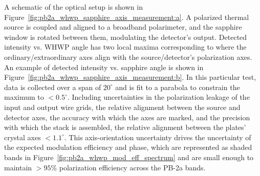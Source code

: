 A schematic of the optical setup is shown in Figure~\ref{fig:pb2a_whwp_sapphire_axis_measurement:a}. A polarized thermal source is coupled and aligned to a broadband polarimeter, and the sapphire window is rotated between them, modulating the detector's output. Detected intensity vs. WHWP angle has two local maxima corresponding to where the ordinary/extraordinary axes align with the source/detector's polarization axes. An example of detected intensity vs. sapphire angle is shown in Figure~\ref{fig:pb2a_whwp_sapphire_axis_measurement:b}. In this particular test, data is collected over a span of $20^{\circ}$ and is fit to a parabola to constrain the maximum to $< 0.5^{\circ}$. Including uncertainties in the polarization leakage of the input and output wire grids, the relative alignment between the source and detector axes, the accuracy with which the axes are marked, and the precision with which the stack is assembled, the relative alignment between the plates' crystal axes $< 1.1^{\circ}$. This axis-orientation uncertainty drives the uncertainty of the expected modulation efficiency and phase, which are represented as shaded bands in Figure~\ref{fig:pb2a_whwp_mod_eff_spectrum} and are small enough to maintain $> 95$\% polarization efficiency across the PB-2a bands.

